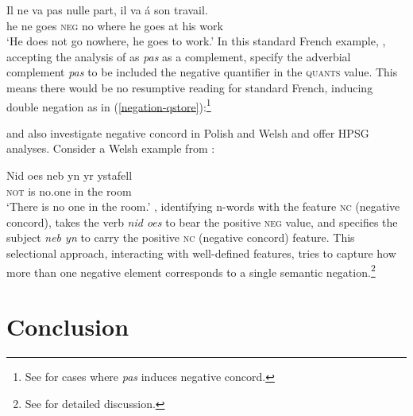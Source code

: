 \documentclass[output=paper
	        ,collection
	        ,collectionchapter
 	        ,biblatex
                ,babelshorthands
                ,newtxmath
                ,draftmode
                ,colorlinks, citecolor=brown
]{langscibook}
\begin{document}
{\begin{exe}
\begin{xlist}
\ea
\gll Il ne va pas nulle part,         il va \'{a} son travail.\\
     he ne goes \textsc{neg} no where he goes at  his work\\
\glt `He does not go nowhere, he goes to work.'
\z
%
In this standard French example, \citet{Swart:02}, accepting
the analysis of \citet{Kim:00} as \textit{pas} as a complement,
specify the adverbial complement \emph{pas} to be included the negative quantifier in the \textsc{quants} value.
 This means there would be no resumptive
reading for standard French, inducing double negation as in (\ref{negation-qstore}):\footnote{See \citet{Swart:02} for cases where \textit{pas} induces negative concord.}

\ea
\label{negation-qstore}
\z

\citet{PK:99} and \citet{BJ:00} also  investigate negative concord in Polish and Welsh
and offer HPSG analyses. Consider a Welsh example from \citet{BJ:00}:

\ea
\gll Nid         oes neb yn yr ystafell\\
\textsc{not}    is no.one in the room\\
\glt `There is no one in the room.'
\z
\noindent \citet{BJ:00}, identifying n-words with the feature
\textsc{nc} (negative
concord),  takes the verb \emph{nid oes} to bear the positive \textsc{neg} value,
and specifies the subject \emph{neb yn} to carry the positive \textsc{nc} (negative
concord) feature. This selectional approach, interacting with
well-defined features, tries to capture how more than one
negative element corresponds to a single semantic negation.\footnote{See
\citet{BJ:00} for detailed discussion.}



\section{Conclusion}





\end{xlist}
\end{exe}}
\end{document}
